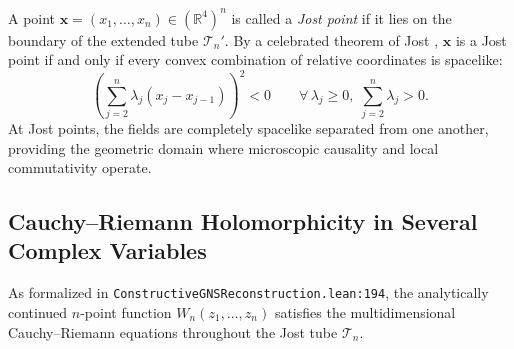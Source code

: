 A point $\mathbf{x} = (x_1, \dots, x_n) \in (\mathbb{R}^4)^n$ is called a \emph{Jost point} if it lies on the boundary of the extended tube $\mathcal{T}_n'$. By a celebrated theorem of Jost \cite{StreaterWightman1964}, $\mathbf{x}$ is a Jost point if and only if every convex combination of relative coordinates is spacelike:
\begin{equation}
\left( \sum_{j=2}^n \lambda_j (x_j - x_{j-1}) \right)^2 < 0 \qquad \forall \, \lambda_j \ge 0, \; \sum_{j=2}^n \lambda_j > 0.
\end{equation}
At Jost points, the fields are completely spacelike separated from one another, providing the geometric domain where microscopic causality and local commutativity operate.

\subsection{Cauchy--Riemann Holomorphicity in Several Complex Variables}
\label{subsec:cauchy_riemann_holomorphicity}

As formalized in \texttt{ConstructiveGNSReconstruction.lean:194}, the analytically continued $n$-point function $W_n(z_1, \dots, z_n)$ satisfies the multidimensional Cauchy--Riemann equations throughout the Jost tube $\mathcal{T}_n$.

